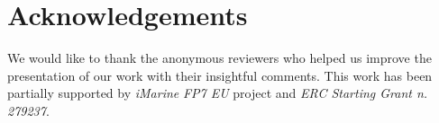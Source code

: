 \section{Acknowledgements}
\label{section:acknowledge}

We would like to thank the anonymous reviewers who helped us 
improve the presentation of our work with their insightful comments. 
This  work  has  been  partially  supported  by
\emph{iMarine} \emph{FP7 EU} project and \emph{ERC Starting Grant n. 279237}.
